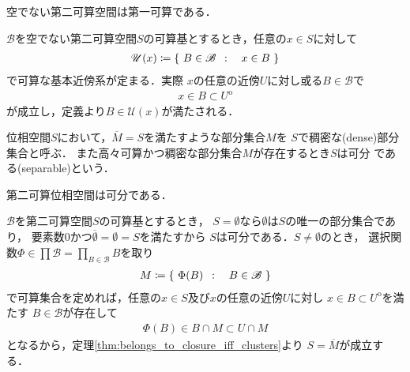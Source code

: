 	\begin{screen}
		\begin{thm}[第二可算なら第一可算]
			空でない第二可算空間は第一可算である．
		\end{thm}
	\end{screen}
	
	\begin{prf}
		$\mathscr{B}$を空でない第二可算空間$S$の可算基とするとき，任意の$x \in S$に対して
		\begin{align}
			\mathscr{U}(x) \coloneqq
			\left\{\ B \in \mathscr{B}\ \, : \quad x \in B\ \right\}
		\end{align}
		で可算な基本近傍系が定まる．実際
		$x$の任意の近傍$U$に対し或る$B \in \mathscr{B}$で
		\begin{align}
			x \in B \subset U^{\mathrm{o}}
		\end{align}
		が成立し，定義より$B \in \mathscr{U}(x)$が満たされる．
		\QED
	\end{prf}
	
	\begin{screen}
		\begin{dfn}[稠密・可分]
			位相空間$S$において，$\overline{M} = S$を満たすような部分集合$M$を
			$S$で稠密な(dense)部分集合と呼ぶ．
			また高々可算かつ稠密な部分集合$M$が存在するとき$S$は可分
			である(separable)という．
		\end{dfn}
	\end{screen}
	
	\begin{screen}
		\begin{thm}[第二可算なら可分]\label{thm:second_countable_then_separable}
			第二可算位相空間は可分である．
		\end{thm}
	\end{screen}
	
	\begin{prf}
		$\mathscr{B}$を第二可算空間$S$の可算基とするとき，
		$S = \emptyset$なら$\emptyset$は$S$の唯一の部分集合であり，
		要素数$0$かつ$\overline{\emptyset} = \emptyset = S$を満たすから
		$S$は可分である．$S \neq \emptyset$のとき，
		選択関数$\Phi \in \prod \mathscr{B} = \prod_{B \in \mathscr{B}} B$を取り
		\begin{align}
			M \coloneqq \left\{\ \Phi(B)\ \, : \quad B \in \mathscr{B}\ \right\}
		\end{align}
		で可算集合を定めれば，任意の$x \in S$及び$x$の任意の近傍$U$に対し
		$x \in B \subset U^{\mathrm{o}}$を満たす
		$B \in \mathscr{B}$が存在して
		\begin{align}
			\Phi(B) \in B \cap M \subset U \cap M
		\end{align}
		となるから，定理\ref{thm:belongs_to_closure_iff_clusters}より
		$S = \overline{M}$が成立する．
		\QED
	\end{prf}
	
